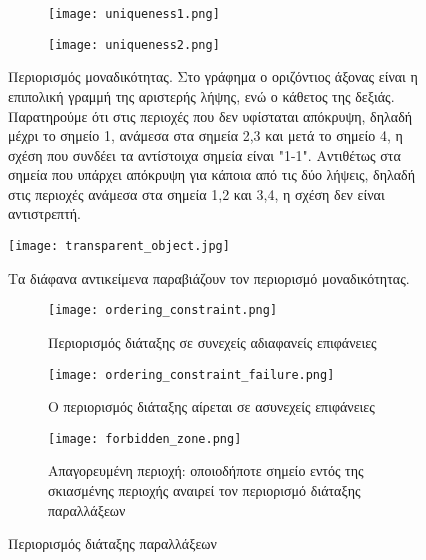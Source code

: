 \begin{figure}
	\centering
	\begin{subfigure}{.6\textwidth}
		\texttt{[image: uniqueness1.png]}
	\end{subfigure}
	\begin{subfigure}{.6\textwidth}
		\texttt{[image: uniqueness2.png]}
	\end{subfigure}
	\caption{Περιορισμός μοναδικότητας. Στο γράφημα ο οριζόντιος άξονας είναι η επιπολική γραμμή της αριστερής λήψης, ενώ ο κάθετος της δεξιάς. Παρατηρούμε ότι στις περιοχές που δεν υφίσταται απόκρυψη, δηλαδή μέχρι το σημείο 1, ανάμεσα στα σημεία 2,3 και μετά το σημείο 4, η σχέση που συνδέει τα αντίστοιχα σημεία είναι "1-1". Αντιθέτως στα σημεία που υπάρχει απόκρυψη για κάποια από τις δύο λήψεις, δηλαδή στις περιοχές ανάμεσα στα σημεία 1,2 και 3,4, η σχέση δεν είναι αντιστρεπτή.}
	\label{fig:uniqueness_constraint}
\end{figure}

\begin{figure}
	\centering
	\texttt{[image: transparent\_object.jpg]}
	\caption{Τα διάφανα αντικείμενα παραβιάζουν τον περιορισμό μοναδικότητας.}
	\label{fig:transparent_object}
\end{figure}

\begin{figure}
	\centering
	\begin{subfigure}{.49\textwidth}
		\texttt{[image: ordering\_constraint.png]}
		\caption{Περιορισμός διάταξης σε συνεχείς αδιαφανείς επιφάνειες}
		\label{fig:ordering_constraint_success}
	\end{subfigure}
	\begin{subfigure}{.49\textwidth}
		\texttt{[image: ordering\_constraint\_failure.png]}
		\caption{Ο περιορισμός διάταξης αίρεται σε ασυνεχείς επιφάνειες}
		\label{fig:ordering_constraint_failure}
	\end{subfigure}
	\begin{subfigure}{.49\textwidth}
		\texttt{[image: forbidden\_zone.png]}
		\caption{Απαγορευμένη περιοχή: οποιοδήποτε σημείο εντός της σκιασμένης περιοχής αναιρεί τον περιορισμό διάταξης παραλλάξεων}
		\label{fig:forbidden_zone}
	\end{subfigure}
	\caption{Περιορισμός διάταξης παραλλάξεων}
	\label{fig:ordering_constraint}
\end{figure}


